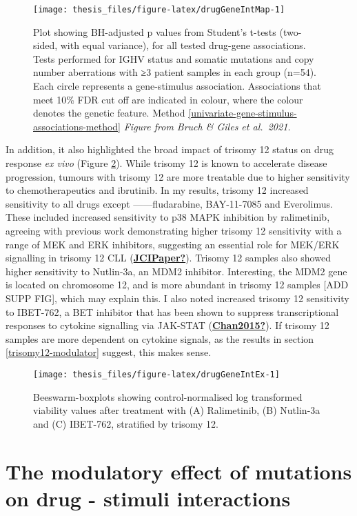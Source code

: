 \documentclass[11pt, a4paper, twosided]{book}
\begin{document}
\begin{figure}

{\centering \texttt{[image: thesis\_files/figure-latex/drugGeneIntMap-1]} 

}

\caption{Plot showing BH-adjusted p values from Student's t-tests (two-sided, with equal variance), for all tested drug-gene associations. Tests performed for IGHV status and somatic mutations and copy number aberrations with ≥3 patient samples in each group (n=54). Each circle represents a gene-stimulus association. Associations that meet 10\% FDR cut off are indicated in colour, where the colour denotes the genetic feature. Method \ref{univariate-gene-stimulus-associations-method} \emph{Figure from Bruch \& Giles et al.~2021.}}\label{fig:drugGeneIntMap}
\end{figure}
In addition, it also highlighted the broad impact of trisomy 12 status on drug response \emph{ex vivo} (Figure \ref{fig:drugGeneIntEx}). While trisomy 12 is known to accelerate disease progression, tumours with trisomy 12 are more treatable due to higher sensitivity to chemotherapeutics and ibrutinib. In my results, trisomy 12 increased sensitivity to all drugs except ------fludarabine, BAY-11-7085 and Everolimus. These included increased sensitivity to p38 MAPK inhibition by ralimetinib, agreeing with previous work demonstrating higher trisomy 12 sensitivity with a range of MEK and ERK inhibitors, suggesting an essential role for MEK/ERK signalling in trisomy 12 CLL (\protect\hyperlink{ref-JCIPaper}{\textbf{JCIPaper?}}). Trisomy 12 samples also showed higher sensitivity to Nutlin-3a, an MDM2 inhibitor. Interesting, the MDM2 gene is located on chromosome 12, and is more abundant in trisomy 12 samples {[}ADD SUPP FIG{]}, which may explain this. I also noted increased trisomy 12 sensitivity to IBET-762, a BET inhibitor that has been shown to suppress transcriptional responses to cytokine signalling via JAK-STAT (\protect\hyperlink{ref-Chan2015}{\textbf{Chan2015?}}). If trisomy 12 samples are more dependent on cytokine signals, as the results in section \ref{trisomy12-modulator} suggest, this makes sense.


\begin{figure}

{\centering \texttt{[image: thesis\_files/figure-latex/drugGeneIntEx-1]} 

}

\caption{Beeswarm-boxplots showing control-normalised log transformed viability values after treatment with (A) Ralimetinib, (B) Nutlin-3a and (C) IBET-762, stratified by trisomy 12.}\label{fig:drugGeneIntEx}
\end{figure}
\hypertarget{drug-stimulus-gene-interactions}{%
\section{The modulatory effect of mutations on drug - stimuli interactions}\label{drug-stimulus-gene-interactions}}
\end{document}
